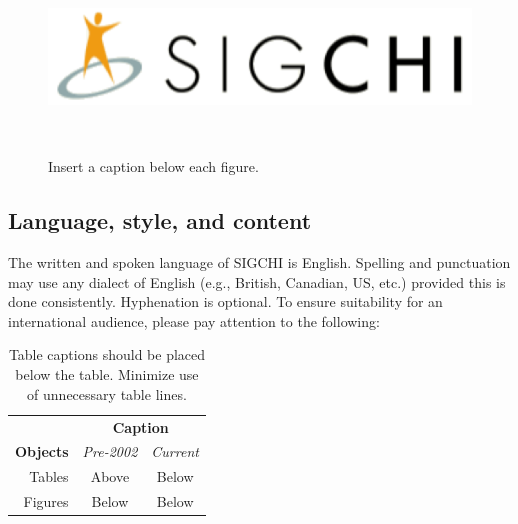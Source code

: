 \documentclass{sigchi-ext}
\begin{document}
\begin{figure}
  \includegraphics[width=0.9\columnwidth]{figures/sigchi-logo}
  \caption{Insert a caption below each figure.}~\label{fig:sample}
\end{figure}

\subsection{Language, style, and content}
The written and spoken language of SIGCHI is English. Spelling and
punctuation may use any dialect of English (e.g., British, Canadian,
US, etc.) provided this is done consistently. Hyphenation is
optional. To ensure suitability for an international audience, please
pay attention to the following:

\begin{table}
  \centering
  \begin{tabular}{r c c}
    & \multicolumn{2}{c}{\small{\textbf{Caption}}} \\
    \cmidrule(r){2-3}
    {\small\textbf{Objects}}
    & {\small \textit{Pre-2002}}
    & {\small \textit{Current}} \\
    \midrule
    Tables & Above & Below \\
    Figures & Below & Below \\
  \end{tabular}
  \caption{Table captions should be placed below the table. Minimize use of
    unnecessary table lines.}~\label{tab:table1}
\end{table}
\end{document}
